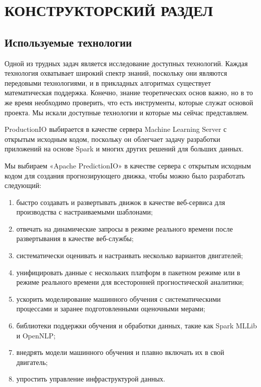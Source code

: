 \chapter{КОНСТРУКТОРСКИЙ РАЗДЕЛ}


\section{Используемые технологии}

Одной из трудных задач является исследование доступных технологий. Каждая технология охватывает широкий спектр знаний, поскольку они являются передовыми технологиями, и в прикладных алгоритмах существует математическая поддержка. Конечно, знание теоретических основ важно, но в то же время необходимо проверить, что есть инструменты, которые служат основой проекта. Мы искали доступные технологии и которые мы сейчас представляем.

ProductionIO \cite{predictionio} выбирается в качестве сервера Machine Learning Server с открытым исходным кодом, поскольку он облегчает задачу разработки приложений на основе Spark и многих других решений для больших данных.

Мы выбираем «Apache PredictionIO» в качестве сервера с открытым исходным кодом для создания прогнозирующего движка, чтобы можно было разработать следующий:

\begin{enumerate}
	\item быстро создавать и развертывать движок в качестве веб-сервиса для производства с настраиваемыми шаблонами;

	\item отвечать на динамические запросы в режиме реального времени после развертывания в качестве веб-службы;

	\item систематически оценивать и настраивать несколько вариантов двигателей;

	\item унифицировать данные с нескольких платформ в пакетном режиме или в режиме реального времени для всесторонней прогностической аналитики;

	\item ускорить моделирование машинного обучения с систематическими процессами и заранее подготовленными оценочными мерами;

	\item библиотеки поддержки обучения и обработки данных, такие как Spark MLLib и OpenNLP;

	\item внедрять модели машинного обучения и плавно включать их в свой двигатель;

	\item упростить управление инфраструктурой данных.
\end{enumerate}

